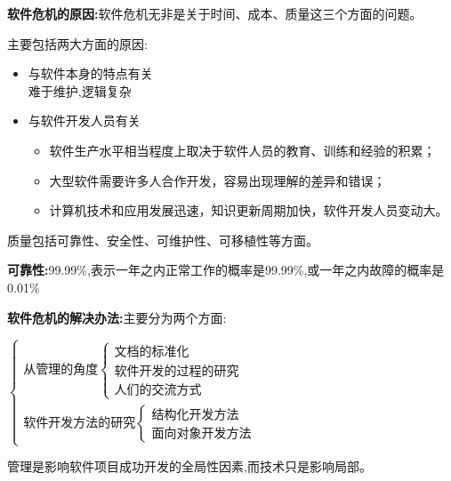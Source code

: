 \documentclass[UTF8,a4paper]{ctexart}
\newcommand{\spaceline}{\vspace{\baselineskip}}
\begin{document}
    \textbf{软件危机的原因:}软件危机无非是关于时间、成本、质量这三个方面的问题。

    主要包括两大方面的原因:
    \begin{itemize}
      \item 与软件本身的特点有关\\
      难于维护,逻辑复杂
      \item 与软件开发人员有关
      \begin{itemize}
        \item 软件生产水平相当程度上取决于软件人员的教育、训练和经验的积累；

        \item 大型软件需要许多人合作开发，容易出现理解的差异和错误；

        \item 计算机技术和应用发展迅速，知识更新周期加快，软件开发人员变动大。

      \end{itemize}
    \end{itemize}

    \spaceline
    质量包括可靠性、安全性、可维护性、可移植性等方面。

    \spaceline
    \textbf{可靠性:}99.99\%,表示一年之内正常工作的概率是99.99\%,或一年之内故障的概率是0.01\%

    \spaceline
    \textbf{软件危机的解决办法:}主要分为两个方面:

    $\left \{\begin{array}{l}
      \text{从管理的角度}\left \{\begin{array}{l}
      \text{文档的标准化}\\
      \text{软件开发的过程的研究}\\
      \text{人们的交流方式}
      \end{array}\right .
      \\
      \text{软件开发方法的研究} \left \{ \begin{array}{l}
      \text{结构化开发方法}\\
      \text{面向对象开发方法}
      \end{array} \right .
    \end{array}\right .$

    管理是影响软件项目成功开发的全局性因素,而技术只是影响局部。\spaceline
\end{document}
